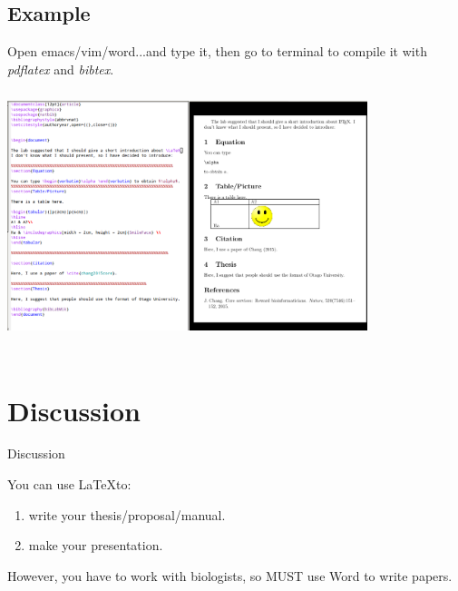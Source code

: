 \documentclass[]{beamer}
\begin{document}
\subsection{Example}
\begin{frame}{}
\vspace{-0.4cm}
Open emacs/vim/word...and type it, then go to terminal to compile it with \textit{pdflatex} and \textit{bibtex}.
\hspace{-0.5cm}
\includegraphics[width = 10.5cm, height = 8cm]{fullExample.png}

\end{frame}
\section{Discussion}
\begin{frame}{Discussion}

You can use \LaTeX to:
\begin{enumerate}
\item write your thesis/proposal/manual.
\item make your presentation.
\end{enumerate}

\vspace{1cm}
However, you have to work with biologists, so MUST use Word to write papers.

\end{frame}


\end{document}
